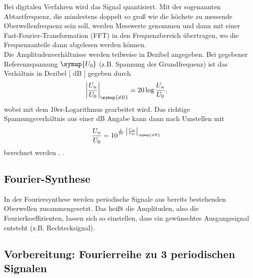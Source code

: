 \noindent Bei digitalen Verfahren wird das Signal quantisiert. Mit der sogenannten
Abtastfrequenz, die mindestens doppelt so groß wie die höchste zu messende Oberwellenfrequenz sein soll,
werden Messwerte genommen und dann mit einer Fast-Fourier-Transformation (FFT) in den
Frequenzbereich übertragen, wo die Frequenzanteile dann abgelesen werden können.\\

\noindent Die Amplitudenverhältnisse werden teilweise in Dezibel angegeben. Bei gegebener Referenzspannung
$\symup{U_0}$ (z.B. Spannung der Grundfrequenz) ist das Verhältnis in Dezibel [ dB ] gegeben durch
\begin{equation}
    \left|\frac{U_n}{U_0}\right|_{\symup{dB}}=20\log{\frac{U_n}{U_0}},
    \label{eqn:Dezibel}
\end{equation}
wobei mit dem 10er-Logarithmus gearbeitet wird. Das richtige Spannungsverhältnis aus einer dB Angabe
kann dann nach Umstellen mit
\begin{equation}
    \frac{U_n}{U_0}=10^{\frac{1}{20}\cdot\left|\frac{U_n}{U_0}\right|_{\symup{dB}}}
\end{equation}
berechnet werden \cite{V351}, \cite{NeuesGP}.
\subsection{Fourier-Synthese}
In der Fouriersynthese werden periodische Signale aus bereits bestehenden Oberwellen
zusammengesetzt. Das heißt die Amplituden, also die Fourierkoeffizienten,
lassen sich so einstellen, dass ein gewünschtes Ausgangssignal entsteht (z.B. Rechtecksignal).
\cite{V351}
\subsection{Vorbereitung: Fourierreihe zu 3 periodischen Signalen}
